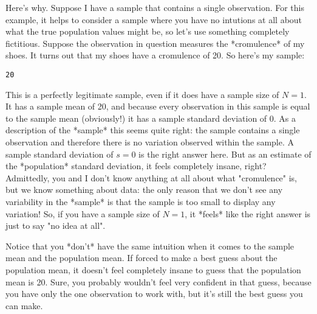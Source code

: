 Here's why. Suppose I have a sample that contains a single observation. For this example, it helps to consider a sample where you have no intutions at all about what the true population values might be, so let's use something completely fictitious. Suppose the observation in question measures the *cromulence* of my shoes. It turns out that my shoes have a cromulence of 20. So here's my sample:
\begin{center}
\texttt{20}
\end{center}
This is a perfectly legitimate sample, even if it does have a sample size of $N=1$. It has a sample mean of 20, and because every observation in this sample is equal to the sample mean (obviously!) it has a sample standard deviation of 0. As a description of the *sample* this seems quite right: the sample contains a single observation and therefore there is no variation observed within the sample. A sample standard deviation of $s = 0$ is the right answer here. But as an estimate of the *population* standard deviation, it feels completely insane, right? Admittedly, you and I don't know anything at all about what "cromulence" is, but we know something about data: the only reason that we don't see any variability in the *sample* is that the sample is too small to display any variation! So, if you have a sample size of $N=1$, it *feels* like the right answer is just to say "no idea at all". 

Notice that you *don't* have the same intuition when it comes to the sample mean and the population mean. If forced to make a best guess about the population mean, it doesn't feel completely insane to guess that the population mean is 20. Sure, you probably wouldn't feel very confident in that guess, because you have only the one observation to work with, but it's still the best guess you can make. 

